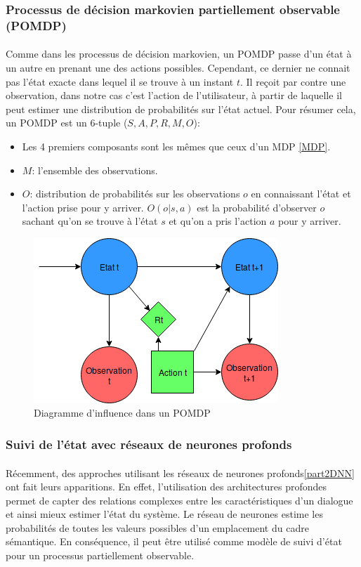 \subsubsection{Processus de décision markovien partiellement observable (POMDP)}
\paragraph{}
Comme dans les processus de décision markovien, un POMDP\cite{Astrom1965} passe d’un état à un autre en prenant une des actions possibles. Cependant, ce dernier ne connait pas l’état exacte dans lequel il se trouve à un instant $t$. Il reçoit par contre une observation, dans notre cas c’est l’action de l’utilisateur, à partir de laquelle il peut estimer une distribution de probabilités sur l’état actuel. Pour résumer cela, un POMDP est un 6-tuple ($S,A,P,R,M,O$):
\begin{itemize}
\item Les 4 premiers composants sont les mêmes que ceux d’un MDP \ref{MDP}.
\item $M$: l’ensemble des observations.
\item $O$: distribution de probabilités sur les observations $o$ en connaissant l’état et l’action prise pour y arriver. $O(o|s,a)$ est la probabilité d’observer $o$ sachant qu’on se trouve à l’état $s$ et qu’on a pris l’action $a$ pour y arriver.
\end{itemize}

\begin{figure}[H]
	\centering
	\includegraphics[width=.5\linewidth]{images/DM/POMDP.png} 
	\caption{Diagramme d'influence dans un POMDP} 
\end{figure}

\subsubsection{Suivi de l’état avec réseaux de neurones profonds}
\paragraph{}
Récemment, des approches utilisant les réseaux de neurones profonds\ref{part2DNN} ont fait leurs apparitions. En effet, l'utilisation des architectures profondes permet de capter des relations complexes entre les caractéristiques d'un dialogue et ainsi mieux estimer l'état du système. Le réseau de neurones estime les probabilités de toutes les valeurs possibles d’un emplacement du cadre sémantique\cite{Henderson2013}. En conséquence, il peut être utilisé comme modèle de suivi d'état pour un processus partiellement observable.

